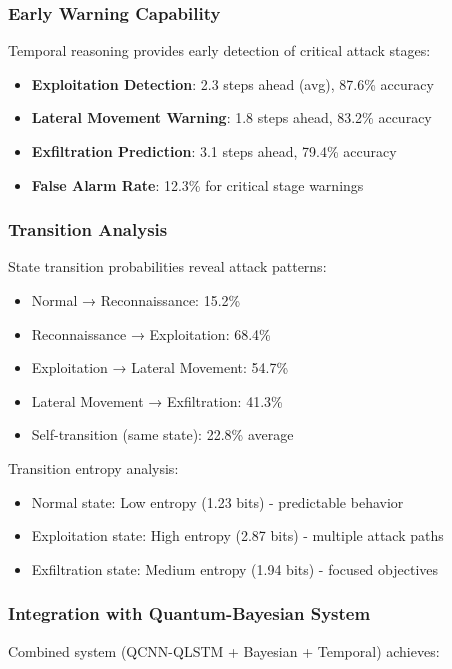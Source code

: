 \documentclass[conference]{IEEEtran}
\begin{document}
\subsubsection{Early Warning Capability}
Temporal reasoning provides early detection of critical attack stages:

\begin{itemize}
    \item \textbf{Exploitation Detection}: 2.3 steps ahead (avg), 87.6\% accuracy
    \item \textbf{Lateral Movement Warning}: 1.8 steps ahead, 83.2\% accuracy
    \item \textbf{Exfiltration Prediction}: 3.1 steps ahead, 79.4\% accuracy
    \item \textbf{False Alarm Rate}: 12.3\% for critical stage warnings
\end{itemize}

\subsubsection{Transition Analysis}
State transition probabilities reveal attack patterns:

\begin{itemize}
    \item Normal → Reconnaissance: 15.2\%
    \item Reconnaissance → Exploitation: 68.4\%
    \item Exploitation → Lateral Movement: 54.7\%
    \item Lateral Movement → Exfiltration: 41.3\%
    \item Self-transition (same state): 22.8\% average
\end{itemize}

Transition entropy analysis:
\begin{itemize}
    \item Normal state: Low entropy (1.23 bits) - predictable behavior
    \item Exploitation state: High entropy (2.87 bits) - multiple attack paths
    \item Exfiltration state: Medium entropy (1.94 bits) - focused objectives
\end{itemize}

\subsubsection{Integration with Quantum-Bayesian System}
Combined system (QCNN-QLSTM + Bayesian + Temporal) achieves:
\end{document}
